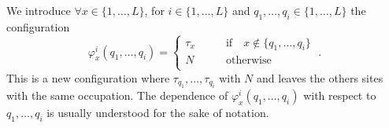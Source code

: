 \documentclass[10pt]{article}
\numberwithin{equation}{section}
\numberwithin{equation}{subsection}
\newcommand{\dt}{\;.}
\begin{document}
We introduce $\forall x\in\{1,\ldots,L\}$, for $i\in \{1,\ldots,L\}$ and $q_{1},\ldots,q_{i}\in\{1,\ldots,L\}$ the configuration 
\begin{equation}
	\varphi_{x}^{i}(q_{1},\ldots,q_{i})=\begin{cases}
		\tau_{x}\qquad &\text{if}\quad x\notin\{q_{1},\ldots,q_{i}\}\\
		N\qquad &\text{otherwise}\\
	\end{cases}\dt
\end{equation}
 This is a new configuration where  $\tau_{q_{1}},\ldots,\tau_{q_{i}}$ with $N$ and leaves the others sites with the same occupation.  The dependence of $\varphi_{x}^{i}(q_{1},\ldots,q_{i})$ with respect to $q_{1},\ldots,q_{i}$ is usually understood for the sake of notation.
    \begin{comment}
    We prove it by induction. When $L=1$ it is true, indeed
    \begin{equation}
    	\mathcal{S}_{2}^{-1}=\sum_{\tau_{1}=1}^{N}\left\{e_{\tau_{1}}^{\tau_{1}}+(1-\delta_{\tau_{1},N})\sum_{q_{1}=1}^{1}\beta_{\tau_{q_{1}}}e_{\tau_{q_{1}}}^{1}\right\}
    \end{equation}
    Assuming that \eqref{InverseS2} is true for arbitrary $L\in \mathbb{N}$, we prove that it holds for $L+1$
\begin{align*}
    	\left(\mathcal{S}_{2}^{-1}\right)^{\otimes L}\otimes \mathcal{S}_{2}^{-1}&=%
    	\sum_{\tau_{1}=1}^{N}\ldots\sum_{\tau_{L}=1}^{N}\left\{e_{\tau_{1},\ldots,\tau_{L}}^{\tau_{1},\ldots,\tau_{L}}+\sum_{q_{1}=1}^{L}(1-\delta_{\tau_{q_{1}},N})e_{\tau_{1},\ldots,\tau_{L}}^{\varphi_{1}^{1},\ldots,\varphi_{L}^{1}}\beta_{\tau_{q_{1}}}\right. 

\end{comment}
\end{document}
